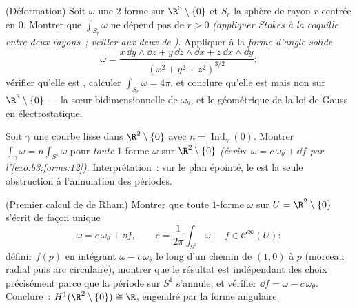 \begin{exercise}[$\star\star\star$]\label{exo:b3:forms:10}
(Déformation) Soit $\omega$ une $2$-forme \emph{} sur
$\R^3\setminus\{0\}$ et $S_r$ la sphère de rayon $r$ centrée
en $0$. Montrer que $\int_{S_r}\omega$ ne dépend pas de $r >
0$ \emph{(appliquer Stokes à la coquille entre deux rayons~;
veiller aux deux  de )}. Appliquer à la
\emph{forme d'angle solide}
\[
\omega = \frac{x\,\dd y\wedge\dd z + y\,\dd z\wedge\dd x +
z\,\dd x\wedge\dd y}{(x^2 + y^2 + z^2)^{3/2}} :
\]
vérifier qu'elle est , calculer $\int_{S_r}\omega =
4\pi$, et conclure qu'elle est  mais non  sur
$\R^3\setminus\{0\}$ --- la sœur bidimensionnelle de
$\omega_\theta$, et le  géométrique de la loi de
Gauss en électrostatique.
\end{exercise}

\begin{exercise}[$\star\star$]\label{exo:b3:forms:11}
Soit $\gamma$ une courbe lisse  dans
$\R^2\setminus\{0\}$ avec $n = \operatorname{Ind}_\gamma(0)$.
Montrer $\int_\gamma\omega = n\int_{S^1}\omega$ pour
\emph{toute} $1$-forme  $\omega$ sur
$\R^2\setminus\{0\}$ \emph{(écrire $\omega = c\,\omega_\theta
+ \dd f$ par l'\cref{exo:b3:forms:12})}. Interprétation~: sur le
plan épointé, le  est la seule
obstruction à l'annulation des périodes.
\end{exercise}

\begin{exercise}[$\star\star\star$]\label{exo:b3:forms:12}
(Premier calcul de de Rham) Montrer que toute $1$-forme
 $\omega$ sur $U = \R^2\setminus\{0\}$ s'écrit de
façon unique
\[
\omega = c\,\omega_\theta + \dd f,
\qquad c = \frac1{2\pi}\int_{S^1}\omega,\quad f \in
\mathcal C^\infty(U) :
\]
définir $f(p)$ en intégrant $\omega - c\,\omega_\theta$ le
long d'un chemin de $(1,0)$ à $p$ (morceau radial puis arc
circulaire), montrer que le résultat est indépendant des
choix précisément parce que la période sur $S^1$ s'annule, et
vérifier $\dd f = \omega - c\,\omega_\theta$. Conclure~:
$H^1(\R^2\setminus\{0\}) \cong \R$, engendré par la forme
angulaire.
\end{exercise}

